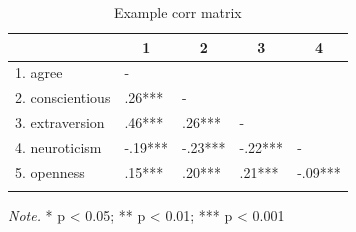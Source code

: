 \documentclass[
  english,
  man,floatsintext]{apa6}
\begin{document}
\begin{table}[tbp]

\begin{center}
\begin{threeparttable}

\caption{\label{tab:scale-intercors-tbl}Example corr matrix}

\begin{tabular}{lllll}
\toprule
 & \multicolumn{1}{c}{1} & \multicolumn{1}{c}{2} & \multicolumn{1}{c}{3} & \multicolumn{1}{c}{4}\\
\midrule
1. agree & - &  &  & \\
2. conscientious & .26*** & - &  & \\
3. extraversion & .46*** & .26*** & - & \\
4. neuroticism & -.19*** & -.23*** & -.22*** & -\\
5. openness & .15*** & .20*** & .21*** & -.09***\\
\bottomrule
\addlinespace
\end{tabular}

\begin{tablenotes}[para]
\normalsize{\textit{Note.} * p < 0.05; ** p < 0.01; *** p < 0.001}
\end{tablenotes}

\end{threeparttable}
\end{center}

\end{table}
\end{document}
